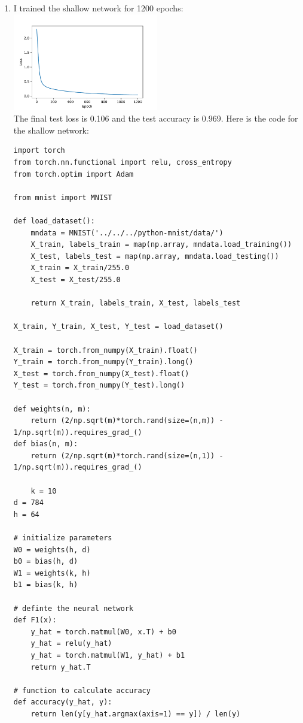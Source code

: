 \documentclass{article}
\begin{document}
\begin{enumerate}
        \item I trained the shallow network for 1200 epochs: \\
        \includegraphics[width=0.5\textwidth]{code/A6a.pdf} \\
        The final test loss is 0.106 and the test accuracy is 0.969.
        Here is the code for the shallow network:
        \begin{verbatim}
import torch
from torch.nn.functional import relu, cross_entropy
from torch.optim import Adam

from mnist import MNIST

def load_dataset():
    mndata = MNIST('../../../python-mnist/data/')
    X_train, labels_train = map(np.array, mndata.load_training())
    X_test, labels_test = map(np.array, mndata.load_testing())
    X_train = X_train/255.0
    X_test = X_test/255.0
    
    return X_train, labels_train, X_test, labels_test

X_train, Y_train, X_test, Y_test = load_dataset()

X_train = torch.from_numpy(X_train).float()
Y_train = torch.from_numpy(Y_train).long()
X_test = torch.from_numpy(X_test).float()
Y_test = torch.from_numpy(Y_test).long()

def weights(n, m):
    return (2/np.sqrt(m)*torch.rand(size=(n,m)) - 1/np.sqrt(m)).requires_grad_()
def bias(n, m):
    return (2/np.sqrt(m)*torch.rand(size=(n,1)) - 1/np.sqrt(m)).requires_grad_()

    k = 10
d = 784
h = 64

# initialize parameters
W0 = weights(h, d)
b0 = bias(h, d)
W1 = weights(k, h)
b1 = bias(k, h)

# definte the neural network
def F1(x):
    y_hat = torch.matmul(W0, x.T) + b0
    y_hat = relu(y_hat)
    y_hat = torch.matmul(W1, y_hat) + b1
    return y_hat.T

# function to calculate accuracy
def accuracy(y_hat, y):
    return len(y[y_hat.argmax(axis=1) == y]) / len(y)


\end{verbatim}
\end{enumerate}
\end{document}
